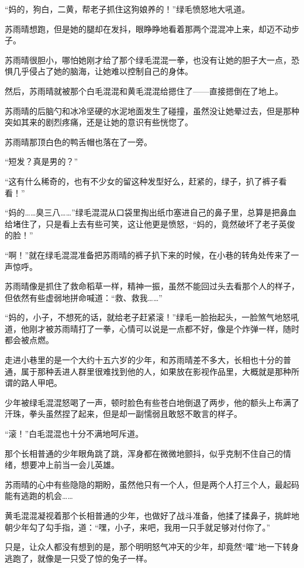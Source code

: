 “妈的，狗白，二黄，帮老子抓住这狗娘养的！”绿毛愤怒地大吼道。

苏雨晴想跑，但是她的腿却在发抖，眼睁睁地看着那两个混混冲上来，却迈不动步子。

苏雨晴很胆小，哪怕她刚才给了那个绿毛混混一拳，也没有让她的胆子大一点，恐惧几乎侵占了她的脑海，让她难以控制自己的身体。

然后，苏雨晴就被那个白毛混混和黄毛混混给摁住了——直接摁倒在了地上。

苏雨晴的后脑勺和冰冷坚硬的水泥地面发生了碰撞，虽然没让她晕过去，但是那种突如其来的剧烈疼痛，还是让她的意识有些恍惚了。

苏雨晴那顶白色的鸭舌帽也落在了一旁。

“短发？真是男的？”

“这有什么稀奇的，也有不少女的留这种发型好么，赶紧的，绿子，扒了裤子看看！”

“妈的……臭三八……”绿毛混混从口袋里掏出纸巾塞进自己的鼻子里，总算是把鼻血给堵住了，只是看上去有些可笑，这让他更是愤怒，“妈的，竟然破坏了老子英俊的脸！”

“啊！”就在绿毛混混准备把苏雨晴的裤子扒下来的时候，在小巷的转角处传来了一声惊呼。

苏雨晴像是抓住了救命稻草一样，精神一振，虽然不能回过头去看那个人的样子，但依然有些虚弱地拼命喊道：“救、救我……”

“妈的，小子，不想死的话，就给老子赶紧滚！”绿毛一脸抬起头，一脸煞气地怒吼道，他刚才被苏雨晴打了一拳，心情可以说是一点都不好，像是个炸弹一样，随时都会被点燃。

走进小巷里的是一个大约十五六岁的少年，和苏雨晴差不多大，长相也十分的普通，属于那种丢进人群里很难找到他的人，如果放在影视作品里，大概就是那种所谓的路人甲吧。

少年被绿毛混混怒喝了一声，顿时脸色有些苍白地倒退了两步，他的额头上布满了汗珠，拳头虽然捏了起来，但是却一副懦弱且敢怒不敢言的样子。

“滚！”白毛混混也十分不满地呵斥道。

那个长相普通的少年眼角跳了跳，浑身都在微微地颤抖，似乎克制不住自己的情绪，想要冲上前当一会儿英雄。

苏雨晴的心中有些隐隐的期盼，虽然他只有一个人，但是两个人打三个人，最起码能有逃跑的机会……

黄毛混混凝视着那个长相普通的少年，也做好了战斗准备，他揉了揉鼻子，挑衅地朝少年勾了勾手指，道：“嘿，小子，来吧，我用一只手就足够对付你了。”

只是，让众人都没有想到的是，那个明明怒气冲天的少年，却竟然“嚯”地一下转身逃跑了，就像是一只受了惊的兔子一样。


